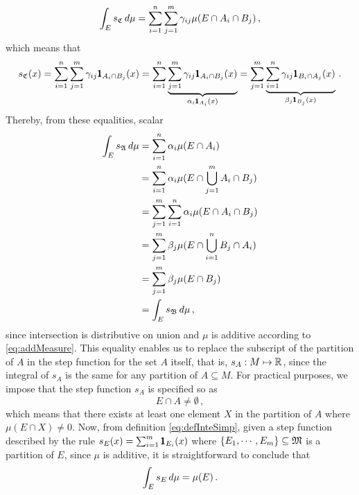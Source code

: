 \begin{equation*}
\int_E s_{\mathfrak{C}}\,d\mu = \sum_{i=1}^n\sum_{j=1}^m\gamma_{ij}\mu(E\cap A_i\cap B_j)\,,
\end{equation*}
which means that
\begin{equation*}
s_{\mathfrak{C}}(x) = \sum_{i=1}^n\sum_{j=1}^m\gamma_{ij}\pmb{1}_{A_i\cap B_j}(x) = \sum_{i=1}^n\underbrace{\sum_{j=1}^m\gamma_{ij}\pmb{1}_{A_i\cap B_j}(x)}_{\alpha_i\pmb{1}_{A_i}(x)}=\sum_{j=1}^m\underbrace{\sum_{i=1}^n\gamma_{ij}\pmb{1}_{B_i\cap A_j}(x)}_{\beta_j\pmb{1}_{B_j}(x)}\,.
\end{equation*}
Thereby, from these equalities, scalar 
\begin{align*}
\int_E s_{\mathfrak{A}}\,d\mu &= \sum_{i=1}^n\alpha_i\mu(E\cap A_i)\\
&= \sum_{i=1}^n\alpha_i\mu(E\cap \bigcup_{j=1}^mA_i\cap B_j)\\
&= \sum_{j=1}^m\sum_{i=1}^n\alpha_i\mu(E\cap A_i\cap B_j)\\
&= \sum_{j=1}^m\beta_j\mu(E\cap \bigcup_{i=1}^nB_j\cap A_i)\\
&= \sum_{j=1}^m\beta_j\mu(E\cap B_j)\\
&=\int_E s_{\mathfrak{B}}\,d\mu\,,
\end{align*}
since intersection is distributive on union and $\mu$ is additive according to \eqref{eq:addMeasure}. This equality enables us to replace the subscript of the partition of $A$ in the step function for the set $A$ itself, that is, $s_A : M \mapsto \mathbb{R}$, since the integral of $s_A$ is the same for any partition of $A\subseteq M$. 
For practical purposes, we impose that the step function $s_A$ is specified so as
\begin{equation}\label{eq:imposStepNotNull}
E\cap A\neq\emptyset\,,
\end{equation}
which means that there exists at least one element $X$ in the partition of $A$ where $\mu(E\cap X)\neq 0$. Now, from definition \eqref{eq:defInteSimp}, given a step function described by the rule $s_E(x)=\sum_{i=1}^m\pmb{1}_{E_i}(x)$ where $\{E_1,\cdots,E_m\}\subseteq\mathfrak{M}$ is a partition of $E$, since $\mu$ is additive, it is straightforward to conclude that 
\begin{equation}
\int_E s_E\,d\mu = \mu(E)\,.																	
\end{equation}

